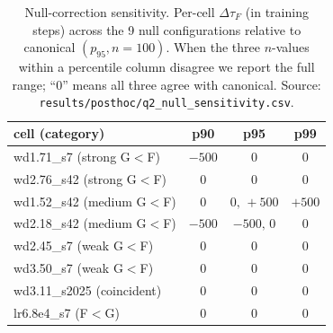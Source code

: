 \documentclass{article}
\newcommand{\tauf}{\tau_{F}}
\begin{document}
\begin{table}[tbp]
  \centering
  \caption{Null-correction sensitivity.
    Per-cell $\Delta\tauf$ (in training steps) across the 9 null
    configurations relative to canonical $(p_{95}, n{=}100)$.
    When the three $n$-values within a percentile column disagree
    we report the full range; ``$0$'' means all three agree with
    canonical.
    Source: \texttt{results/posthoc/q2\_null\_sensitivity.csv}.}
  \label{tab:q2_null_sensitivity}
  \small
  \begin{tabular}{lccc}
    \toprule
    cell (category) & p90 & p95 & p99 \\
    \midrule
    wd1.71\_s7 (strong G$<$F)     & $-500$ & $0$         & $0$            \\
    wd2.76\_s42 (strong G$<$F)    & $0$    & $0$         & $0$            \\
    wd1.52\_s42 (medium G$<$F)    & $0$    & $0,\,+500$  & $+500$         \\
    wd2.18\_s42 (medium G$<$F)    & $-500$ & $-500,\,0$  & $0$            \\
    wd2.45\_s7 (weak G$<$F)       & $0$    & $0$         & $0$            \\
    wd3.50\_s7 (weak G$<$F)       & $0$    & $0$         & $0$            \\
    wd3.11\_s2025 (coincident)    & $0$    & $0$         & $0$            \\
    lr6.8e4\_s7 (F$<$G)           & $0$    & $0$         & $0$            \\
    \bottomrule
  \end{tabular}
\end{table}
\end{document}
